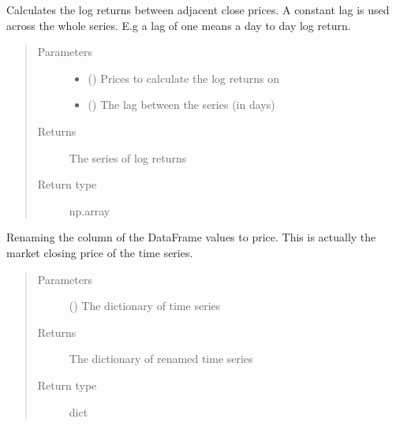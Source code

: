 \documentclass[letterpaper,10pt,english]{sphinxmanual}
\begin{document}
\begin{fulllineitems}
\label{\detokenize{index:Forecaster.preprocessing.log_returns}}
Calculates the log returns between adjacent close prices.
A constant lag is used across the whole series.
E.g a lag of one means a day to day log return.
\begin{quote}\begin{description}
\item[{Parameters}] \leavevmode\begin{itemize}
\item {} 
 () \textendash{} Prices to calculate the log returns on

\item {} 
 () \textendash{} The lag between the series (in days)

\end{itemize}

\item[{Returns}] \leavevmode
The series of log returns

\item[{Return type}] \leavevmode
np.array

\end{description}\end{quote}

\end{fulllineitems}


\begin{fulllineitems}
\label{\detokenize{index:Forecaster.preprocessing.price_rename}}
Renaming the column of the DataFrame values to price.
This is actually the market closing price of the time series.
\begin{quote}\begin{description}
\item[{Parameters}] \leavevmode
{} () \textendash{} The dictionary of time series

\item[{Returns}] \leavevmode
The dictionary of renamed time series

\item[{Return type}] \leavevmode
dict

\end{description}\end{quote}

\end{fulllineitems}
\end{document}
